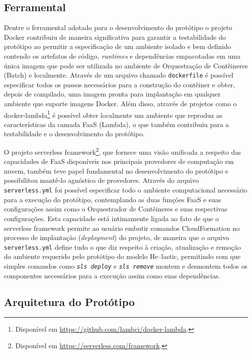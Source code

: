 \documentclass[english,brazilian]{UNISINOSmonografia} %
\begin{document}
\subsection{Ferramental}
Dentre o ferramental adotado para o desenvolvimento do protótipo o projeto Docker contribuiu de maneira significativa para garantir a testabilidade do protótipo ao permitir a especificação de um ambiente isolado e bem definido contendo os artefatos de código, \textit{runtimes} e dependências empacotadas em uma única imagem que pode ser utilizada no ambiente de Orquestração de Contêineres (Batch) e localmente.
%
Através de um arquivo chamado \texttt{dockerfile} é possível especificar todos os passos necessários para a construção do contêiner e obter, depois de compilado, uma imagem pronta para implantação em qualquer ambiente que suporte imagens Docker.
%
Além disso, através de projetos como o docker-lambda\footnote{
	Disponível em \url{https://github.com/lambci/docker-lambda}.
} é possível obter localmente um ambiente que reproduz as características da camada FaaS (Lambda), o que também contribuiu para a testabilidade e o desenvolvimento do protótipo.


O projeto serverless framework\footnote{
	Disponível em \url{https://serverless.com/framework}.
}, que fornece uma visão unificada a respeito das capacidades de FaaS disponíveis nos principais provedores de computação em nuvem, também teve papel fundamental no desenvolvimento do protótipo e possibilitou mantê-lo agnóstico de provedores.
%
Através do arquivo \texttt{serverless.yml} foi possível especificar todo o ambiente computacional necessário para a execução do protótipo, contemplando as duas funções FaaS e suas configurações assim como o Orquestrador de Contêineres e suas respectivas configurações.
%
Esta capacidade está intimamente ligada ao fato de que o serverless framework permite ao usuário embutir comandos CloudFormation no processo de implantação (\textit{deployment}) do projeto, de maneira que o arquivo \texttt{serverless.yml} define tudo o que diz respeito à criação, atualização e remoção do ambiente requerido pelo protótipo do modelo \textsf{He}--lastic, permitindo com que simples comandos como \texttt{\textit{sls deploy}} e \texttt{\textit{sls remove}} montem e desmontem todos os componentes necessários para a execução assim como suas dependências.


\subsection{Arquitetura do Protótipo}
\end{document}
